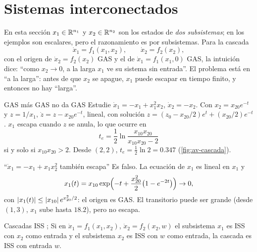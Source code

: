 \section{Sistemas interconectados}
\label{sec:av-inter}

En esta sección $x_1\in\mathbb{R}^{n_1}$ y $x_2\in\mathbb{R}^{n_2}$ son los estados de \emph{dos subsistemas}; en los ejemplos son escalares, pero el razonamiento es por subsistemas. Para la cascada
\[
  \dot x_1=f_1(x_1,x_2),\qquad\dot x_2=f_2(x_2),
\]
con el origen de $\dot x_2=f_2(x_2)$ GAS y el de $\dot x_1=f_1(x_1,0)$ GAS, la intuición dice: ``como $x_2\to0$, a la larga $x_1$ ve su sistema sin entrada''. El problema está en ``a la larga'': antes de que $x_2$ se apague, $x_1$ puede escapar en tiempo finito, y entonces no hay ``larga''.

\begin{ejemplo}[label=ej:av-cascada]{GAS más GAS no da GAS \citep[Ej.~4]{Arc18}}
Estudie $\dot x_1=-x_1+x_1^2x_2$, $\dot x_2=-x_2$.
\solucion Con $x_2=x_{20}e^{-t}$ y $z=1/x_1$, $\dot z=z-x_{20}e^{-t}$, lineal, con solución $z=(z_0-x_{20}/2)e^t+(x_{20}/2)e^{-t}$. $x_1$ escapa cuando $z$ se anula, lo que ocurre en
\[
  t_e=\frac12\ln\frac{x_{10}x_{20}}{x_{10}x_{20}-2}
\]
si y solo si $x_{10}x_{20}>2$. Desde $(2,2)$, $t_e=\tfrac12\ln2=0.347$ (\cref{fig:av-cascada}).
\end{ejemplo}

\begin{trampa}[label=tr:av-cascadaerr]{``$\dot x_1=-x_1+x_1x_2^2$ también escapa''}
Es falso. La ecuación de $x_1$ es lineal en $x_1$ y
\[
  x_1(t)=x_{10}\exp\Bigl(-t+\frac{x_{20}^2}{2}\bigl(1-e^{-2t}\bigr)\Bigr)\to0 ,
\]
con $\left\lvert x_1(t)\right\rvert\le\left\lvert x_{10}\right\rvert e^{x_{20}^2/2}$: el origen es GAS. El transitorio puede ser grande (desde $(1,3)$, $x_1$ sube hasta $18.2$), pero no escapa.
\end{trampa}

\begin{proposicion}[label=prop:av-cascadaiss]{Cascadas ISS \citep{Son89a}; \citep[Teo.~7.9]{KeBr23}}
Si en $\dot x_1=f_1(x_1,x_2)$, $\dot x_2=f_2(x_2,w)$ el subsistema $x_1$ es ISS con $x_2$ como entrada y el subsistema $x_2$ es ISS con $w$ como entrada, la cascada es ISS con entrada $w$.
\end{proposicion}

